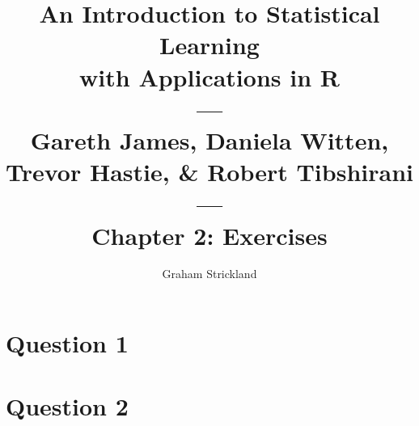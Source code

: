 \documentclass{article}
\title{
    An Introduction to Statistical Learning\\with Applications in R\\---\\
    Gareth James, Daniela Witten, Trevor Hastie, \& Robert Tibshirani\\---\\
    Chapter 2: Exercises
}
\author{Graham Strickland}
\begin{document}
\maketitle  

\section*{Question 1}


\section*{Question 2}

\end{document}
